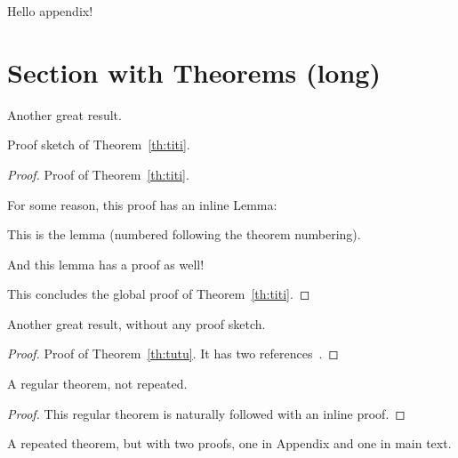 \begin{toappendix}
  Hello appendix!
\end{toappendix}

\section[Section with Theorems (short)]%
        {Section with Theorems (long)}

\begin{theoremrep}
  \label{th:titi}
  Another great result.
\end{theoremrep}

\begin{proofsketch}
  Proof sketch of Theorem~\ref{th:titi}.
\end{proofsketch}

\begin{proof}
  Proof of Theorem~\ref{th:titi}.

  For some reason, this proof has an inline Lemma:
  \begin{lemma}
    This is the lemma (numbered following the theorem numbering).
  \end{lemma} 

  \begin{nestedproof}
    And this lemma has a proof as well!
  \end{nestedproof}

  This concludes the global proof of Theorem~\ref{th:titi}.
\end{proof}

\begin{theoremrep}
  \label{th:tutu}
  Another great result, without any proof sketch.
\end{theoremrep}

\begin{proof}
  Proof of Theorem~\ref{th:tutu}. It has two
  references~\cite{sitemaps,brin1998anatomy}.
\end{proof}

\begin{theorem}
  A regular theorem, not repeated.
\end{theorem}

\begin{proof}
This regular theorem is naturally followed with an inline proof.
\end{proof}

\begin{theoremrep}
  \label{th:weird}
  A repeated theorem, but with two proofs, one in Appendix and one in
  main text.
\end{theoremrep}

